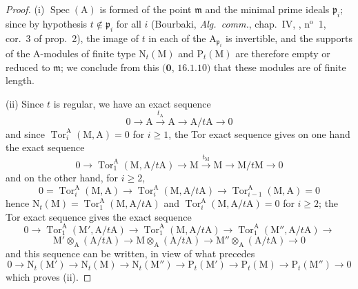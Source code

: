 \begin{proof}
(i) $\operatorname{Spec}(\mathrm{A})$ is formed of the point $\mathfrak{m}$ and the minimal prime ideals $\mathfrak{p}_i$; since by hypothesis $t\notin\mathfrak{p}_i$ for all $i$ (Bourbaki, \emph{Alg.\ comm.}, chap.~IV, , n$^{\mathrm{o}}$~1, cor.~3 of prop.~2), the image of $t$ in each of the $\mathrm{A}_{\mathfrak{p}_i}$ is invertible, and the supports of the A-modules of finite type $\mathrm{N}_t(\mathrm{M})$ and $\mathrm{P}_t(\mathrm{M})$ are therefore empty or reduced to $\mathfrak{m}$; we conclude from this $(\mathbf{0}$, $16.1.10)$ that these modules are of finite length.

(ii) Since $t$ is regular, we have an exact sequence
\[
  0\to\mathrm{A}\xrightarrow{t_{\mathrm{A}}}\mathrm{A}\to\mathrm{A}/t\mathrm{A}\to 0
\]
and since $\operatorname{Tor}_i^{\mathrm{A}}(\mathrm{M},\mathrm{A})=0$ for $i\geq 1$, the Tor exact sequence gives on one hand the exact sequence
\[
  0\to\operatorname{Tor}_1^{\mathrm{A}}(\mathrm{M},\mathrm{A}/t\mathrm{A})\to\mathrm{M}\xrightarrow{t_{\mathrm{M}}}\mathrm{M}\to\mathrm{M}/t\mathrm{M}\to 0
\]
and on the other hand, for $i\geq 2$,
\[
  0=\operatorname{Tor}_i^{\mathrm{A}}(\mathrm{M},\mathrm{A})\to\operatorname{Tor}_i^{\mathrm{A}}(\mathrm{M},\mathrm{A}/t\mathrm{A})\to\operatorname{Tor}_{i-1}^{\mathrm{A}}(\mathrm{M},\mathrm{A})=0
\]
hence $\mathrm{N}_t(\mathrm{M})=\operatorname{Tor}_1^{\mathrm{A}}(\mathrm{M},\mathrm{A}/t\mathrm{A})$ and $\operatorname{Tor}_i^{\mathrm{A}}(\mathrm{M},\mathrm{A}/t\mathrm{A})=0$ for $i\geq 2$; the Tor exact sequence gives the exact sequence
\[
  0\to\operatorname{Tor}_1^{\mathrm{A}}(\mathrm{M}',\mathrm{A}/t\mathrm{A})\to\operatorname{Tor}_1^{\mathrm{A}}(\mathrm{M},\mathrm{A}/t\mathrm{A})\to\operatorname{Tor}_1^{\mathrm{A}}(\mathrm{M}'',\mathrm{A}/t\mathrm{A})\to
\]
\[
  \mathrm{M}'\otimes_{\mathrm{A}}(\mathrm{A}/t\mathrm{A})\to\mathrm{M}\otimes_{\mathrm{A}}(\mathrm{A}/t\mathrm{A})\to\mathrm{M}''\otimes_{\mathrm{A}}(\mathrm{A}/t\mathrm{A})\to 0
\]
and this sequence can be written, in view of what precedes
\[
  0\to\mathrm{N}_t(\mathrm{M}')\to\mathrm{N}_t(\mathrm{M})\to\mathrm{N}_t(\mathrm{M}'')\to\mathrm{P}_t(\mathrm{M}')\to\mathrm{P}_t(\mathrm{M})\to\mathrm{P}_t(\mathrm{M}'')\to 0
\]
which proves (ii).


\end{proof}
